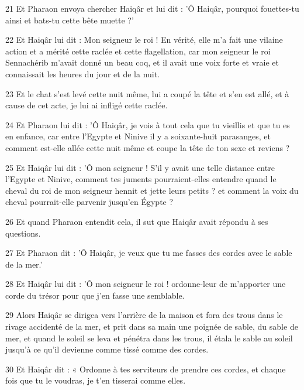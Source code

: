 \par 21 Et Pharaon envoya chercher Haiqâr et lui dit : 'Ô Haiqâr, pourquoi fouettes-tu ainsi et bats-tu cette bête muette ?'

\par 22 Et Haiqâr lui dit : Mon seigneur le roi ! En vérité, elle m'a fait une vilaine action et a mérité cette raclée et cette flagellation, car mon seigneur le roi Sennachérib m'avait donné un beau coq, et il avait une voix forte et vraie et connaissait les heures du jour et de la nuit.

\par 23 Et le chat s'est levé cette nuit même, lui a coupé la tête et s'en est allé, et à cause de cet acte, je lui ai infligé cette raclée.

\par 24 Et Pharaon lui dit : 'Ô Haiqâr, je vois à tout cela que tu vieillis et que tu es en enfance, car entre l'Egypte et Ninive il y a soixante-huit parasanges, et comment est-elle allée cette nuit même et coupe la tête de ton sexe et reviens ?

\par 25 Et Haiqâr lui dit : 'Ô mon seigneur ! S'il y avait une telle distance entre l'Egypte et Ninive, comment tes juments pourraient-elles entendre quand le cheval du roi de mon seigneur hennit et jette leurs petits ? et comment la voix du cheval pourrait-elle parvenir jusqu'en Égypte ?

\par 26 Et quand Pharaon entendit cela, il sut que Haiqâr avait répondu à ses questions.

\par 27 Et Pharaon dit : 'Ô Haiqâr, je veux que tu me fasses des cordes avec le sable de la mer.'

\par 28 Et Haiqâr lui dit : 'Ô mon seigneur le roi ! ordonne-leur de m'apporter une corde du trésor pour que j'en fasse une semblable.

\par 29 Alors Haiqâr se dirigea vers l'arrière de la maison et fora des trous dans le rivage accidenté de la mer, et prit dans sa main une poignée de sable, du sable de mer, et quand le soleil se leva et pénétra dans les trous, il étala le sable au soleil jusqu'à ce qu'il devienne comme tissé comme des cordes.

\par 30 Et Haiqâr dit : « Ordonne à tes serviteurs de prendre ces cordes, et chaque fois que tu le voudras, je t'en tisserai comme elles.

